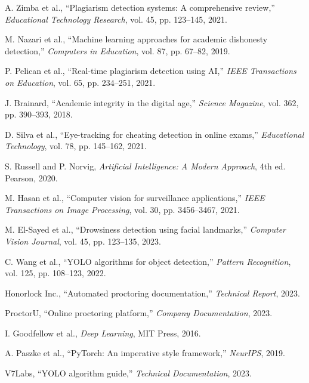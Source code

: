 \documentclass[conference]{IEEEtran}
\begin{document}
\begin{thebibliography}{99}

A. Zimba et al., ``Plagiarism detection systems: A comprehensive review,'' \textit{Educational Technology Research}, vol. 45, pp. 123--145, 2021.

M. Nazari et al., ``Machine learning approaches for academic dishonesty detection,'' \textit{Computers in Education}, vol. 87, pp. 67--82, 2019.

P. Pelican et al., ``Real-time plagiarism detection using AI,'' \textit{IEEE Transactions on Education}, vol. 65, pp. 234--251, 2021.

J. Brainard, ``Academic integrity in the digital age,'' \textit{Science Magazine}, vol. 362, pp. 390--393, 2018.

D. Silva et al., ``Eye-tracking for cheating detection in online exams,'' \textit{Educational Technology}, vol. 78, pp. 145--162, 2021.

S. Russell and P. Norvig, \textit{Artificial Intelligence: A Modern Approach}, 4th ed. Pearson, 2020.

M. Hasan et al., ``Computer vision for surveillance applications,'' \textit{IEEE Transactions on Image Processing}, vol. 30, pp. 3456--3467, 2021.

M. El-Sayed et al., ``Drowsiness detection using facial landmarks,'' \textit{Computer Vision Journal}, vol. 45, pp. 123--135, 2023.

C. Wang et al., ``YOLO algorithms for object detection,'' \textit{Pattern Recognition}, vol. 125, pp. 108--123, 2022.

Honorlock Inc., ``Automated proctoring documentation,'' \textit{Technical Report}, 2023.

ProctorU, ``Online proctoring platform,'' \textit{Company Documentation}, 2023.

I. Goodfellow et al., \textit{Deep Learning}, MIT Press, 2016.

A. Paszke et al., ``PyTorch: An imperative style framework,'' \textit{NeurIPS}, 2019.

V7Labs, ``YOLO algorithm guide,'' \textit{Technical Documentation}, 2023.


\end{thebibliography}
\end{document}
